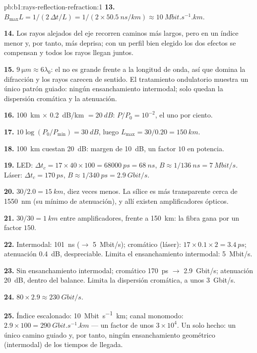 \begin{solution}{pb:b1:rays-reflection-refraction:1}
\textbf{13.} $B_{\max} L = 1/(2\,\Delta t/L) = 1/(2 \times
\qty{50.5}{ns/km}) \approx \qty{10}{Mbit.s^{-1}.km}$.

\textbf{14.} Los rayos alejados del eje recorren caminos más largos, pero
en un índice menor y, por tanto, más deprisa; con un perfil bien elegido
los dos efectos se compensan y todos los rayos llegan juntos.

\textbf{15.} $\qty{9}{\micro m} \approx 6\lambda_0$: el  no es
grande frente a la longitud de onda, así que domina la difracción y los
rayos carecen de sentido. El tratamiento ondulatorio muestra un único
patrón guiado: ningún ensanchamiento intermodal; solo quedan la dispersión
cromática y la atenuación.

\textbf{16.} \qty{100}{km} $\times$ \qty{0.2}{dB/km} $= \qty{20}{dB}$:
$P/P_0 = 10^{-2}$, el uno por ciento.

\textbf{17.} $10\log(P_0/P_{\min}) = \qty{30}{dB}$, luego $L_{\max} =
30/0.20 = \qty{150}{km}$.

\textbf{18.} \qty{100}{km} cuestan \qty{20}{dB}: margen de \qty{10}{dB},
un factor $10$ en potencia.

\textbf{19.} LED: $\Delta t_c = 17 \times 40 \times 100 = \qty{68000}{ps}
= \qty{68}{ns}$, $B \approx 1/\qty{136}{ns} = \qty{7}{Mbit/s}$. Láser:
$\Delta t_c = \qty{170}{ps}$, $B \approx 1/\qty{340}{ps} =
\qty{2.9}{Gbit/s}$.

\textbf{20.} $30/2.0 = \qty{15}{km}$, diez veces menos. La sílice es más
transparente cerca de \qty{1550}{nm} (su mínimo de atenuación), y allí
existen amplificadores ópticos.

\textbf{21.} $30/30 = \qty{1}{km}$ entre amplificadores, frente a
\qty{150}{km}: la fibra gana por un factor $150$.

\textbf{22.} Intermodal: \qty{101}{ns} ($\to$ \qty{5}{Mbit/s});
cromático (láser): $17 \times 0.1 \times 2 = \qty{3.4}{ps}$;
atenuación \qty{0.4}{dB}, despreciable. Limita el ensanchamiento
intermodal: \qty{5}{Mbit/s}.

\textbf{23.} Sin ensanchamiento intermodal; cromático \qty{170}{ps} $\to$
\qty{2.9}{Gbit/s}; atenuación \qty{20}{dB}, dentro del balance. Limita la
dispersión cromática, a unos \qty{3}{Gbit/s}.

\textbf{24.} $80 \times 2.9 \approx \qty{230}{Gbit/s}$.

\textbf{25.} Índice escalonado: \qty{10}{Mbit.s^{-1}.km}; canal monomodo:
$2.9 \times 100 = \qty{290}{Gbit.s^{-1}.km}$ --- un factor de unos
$3\times10^4$. Un solo hecho: un único camino guiado y, por tanto, ningún
ensanchamiento geométrico (intermodal) de los tiempos de llegada.
\end{solution}

